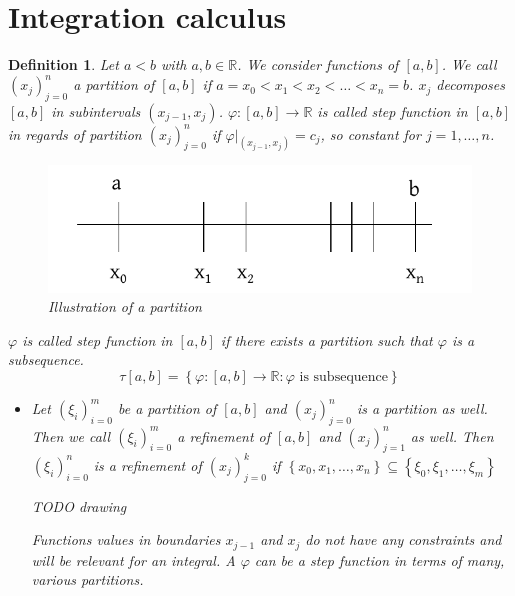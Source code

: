 \documentclass{article}
\newtheorem{definition}{Definition}  \numberwithin{definition}{section}
\newcommand{\set}[1]{\left\{#1\right\}}
\begin{document}
\section{Integration calculus}

\begin{definition}
  Let $a < b$ with $a, b \in \mathbb R$. We consider functions of $[a,b]$.
  We call $(x_j)_{j = 0}^n$ a \emph{partition of $[a,b]$} if $a = x_0 < x_1 < x_2 < \dots < x_n = b$.
  $x_j$ decomposes $[a,b]$ in subintervals $(x_{j-1}, x_j)$.
  $\varphi: [a,b] \to \mathbb R$ is called \emph{step function} in $[a,b]$ in regards of partition $(x_j)_{j=0}^n$
  if $\varphi|_{(x_{j-1}, x_j)} = c_j$, so constant for $j=1,\dots,n$.

  \begin{figure}
    \begin{center}
      \includegraphics{img/09_subintervals.pdf}
      \caption{Illustration of a partition}
      \label{img:subintervals}
    \end{center}
  \end{figure}

  $\varphi$ is called \emph{step function} in $[a,b]$ if there exists a partition such that $\varphi$ is a subsequence.
  \[ \tau[a,b] = \set{\varphi: [a,b] \to \mathbb R: \varphi \text{ is subsequence}} \]
  \begin{itemize}
    \item Let $(\xi_i)_{i=0}^m$ be a partition of $[a,b]$ and $(x_j)_{j=0}^n$ is a partition as well.
      Then we call $(\xi_i)_{i=0}^m$ a \emph{refinement} of $[a,b]$ and $(x_j)_{j=1}^n$ as well.
      Then $(\xi_i)_{i=0}^n$ is a refinement of $(x_j)_{j=0}^k$ if
      $\set{x_0, x_1, \dots, x_n} \subseteq \set{\xi_0, \xi_1, \dots, \xi_m}$

      TODO drawing %

      Functions values in boundaries $x_{j-1}$ and $x_j$ do not have any constraints and will be relevant for an integral.
      A $\varphi$ can be a step function in terms of many, various partitions.
  \end{itemize}
\end{definition}
\end{document}
